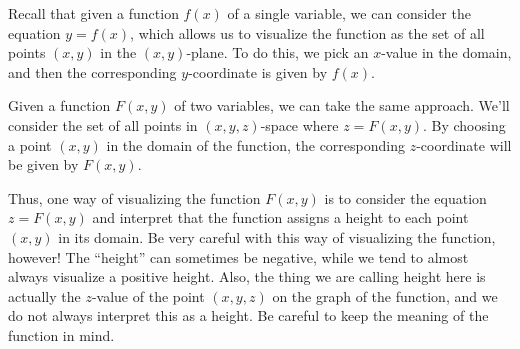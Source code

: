 \documentclass{ximera}
\begin{document}
Recall that given a function $f(x)$ of a single variable, we can
consider the equation $y=f(x)$, which allows us to visualize the
function as the set of all points $(x,y)$ in the $(x,y)$-plane.  To do
this, we pick an $x$-value in the domain, and then the corresponding
$y$-coordinate is given by $f(x)$.


Given a function $F(x,y)$ of two variables, we can take the same
approach.  We'll consider the set of all points in $(x,y,z)$-space
where $z=F(x,y)$.  By choosing a point $(x,y)$ in the domain of the
function, the corresponding $z$-coordinate will be given by $F(x,y)$.
\begin{image}
\end{image}

Thus, one way of visualizing the function $F(x,y)$ is to consider the
equation $z=F(x,y)$ and interpret that the function assigns a
height to each point $(x,y)$ in its domain.  Be very careful with this way 
of visualizing the function, however!  The ``height'' can sometimes be 
negative, while we tend to almost always visualize a positive height.  
Also, the thing we are calling height here is actually the $z$-value of the 
point $(x,y,z)$ on the graph of the function, and we do not always interpret 
this as a height.  Be careful to keep the meaning of the function in mind.
\end{document}
